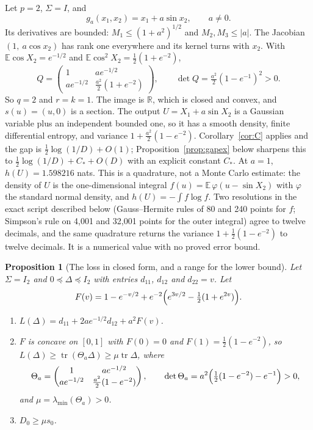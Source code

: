 \documentclass[11pt,onecolumn]{IEEEtran}
\newtheorem{proposition}[theorem]{Proposition}
\newcommand{\E}{\mathbb{E}}
\newcommand{\R}{\mathbb{R}}
\newcommand{\tr}{\operatorname{tr}}
\newcommand{\lmin}{\lambda_{\min}}
\begin{document}
Let $p=2$, $\Sigma=I$, and
\[
g_a(x_1,x_2)=x_1+a\sin x_2,\qquad a\ne0 .
\]
Its derivatives are bounded: $M_1\le(1+a^2)^{1/2}$ and $M_2,M_3\le|a|$. The Jacobian
$(1,\ a\cos x_2)$ has rank one everywhere and its kernel turns with $x_2$. With
$\E\cos X_2=e^{-1/2}$ and $\E\cos^2X_2=\tfrac12(1+e^{-2})$,
\[
Q=\begin{pmatrix}1&ae^{-1/2}\\ ae^{-1/2}&\tfrac{a^2}2(1+e^{-2})\end{pmatrix},\qquad
\det Q=\tfrac{a^2}2(1-e^{-1})^2>0 .
\]
So $q=2$ and $r=k=1$. The image is $\R$, which is closed and convex, and $s(u)=(u,0)$
is a section. The output $U=X_1+a\sin X_2$ is a Gaussian variable plus an independent
bounded one, so it has a smooth density, finite differential entropy, and variance
$1+\tfrac{a^2}2(1-e^{-2})$. Corollary~\ref{cor:C} applies and the gap is
$\tfrac12\log(1/D)+O(1)$; Proposition~\ref{prop:gapex} below sharpens this to
$\tfrac12\log(1/D)+C_*+O(D)$ with an explicit constant $C_*$. At $a=1$, $h(U)=1.598216$ nats. This is a quadrature, not a
Monte Carlo estimate: the density of $U$ is the one-dimensional integral
$f(u)=\E\,\varphi(u-\sin X_2)$ with $\varphi$ the standard normal density, and
$h(U)=-\int f\log f$. Two resolutions in the exact script described below (Gauss--Hermite rules of
80 and 240 points for $f$; Simpson's rule on 4{,}001 and 32{,}001 points for the outer
integral) agree to twelve decimals, and the same quadrature returns the variance
$1+\tfrac12(1-e^{-2})$ to twelve decimals. It is a numerical value with no proved error
bound.

\begin{proposition}[The loss in closed form, and a range for the lower bound]\label{prop:exact}
Let $\Sigma=I_2$ and $0\preceq\Delta\preceq I_2$ with entries $d_{11}$, $d_{12}$ and
$d_{22}=v$. Let
\[
F(v)=1-e^{-v/2}+e^{-2}\Bigl(e^{3v/2}-\tfrac12(1+e^{2v})\Bigr).
\]
\begin{enumerate}
\item[(a)] $L(\Delta)=d_{11}+2ae^{-1/2}d_{12}+a^2F(v)$.
\item[(b)] $F$ is concave on $[0,1]$ with $F(0)=0$ and $F(1)=\tfrac12(1-e^{-2})$, so
$L(\Delta)\ge\tr(\Theta_a\Delta)\ge\mu\tr\Delta$, where
\[
\Theta_a=\begin{pmatrix}1&ae^{-1/2}\\ ae^{-1/2}&\tfrac{a^2}2(1-e^{-2})\end{pmatrix},\qquad
\det \Theta_a=a^2\Bigl(\tfrac12(1-e^{-2})-e^{-1}\Bigr)>0,
\]
and $\mu=\lmin(\Theta_a)>0$.
\item[(c)] $D_0\ge\mu s_0$.
\end{enumerate}
\end{proposition}
\end{document}
